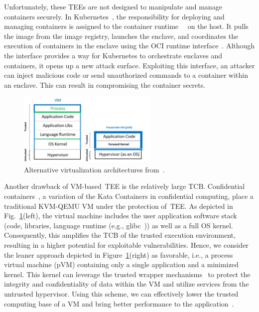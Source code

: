 Unfortunately, these \acrshort{TEE}s are not designed to manipulate and manage containers securely. In Kubernetes~\cite*{k8s}, the responsibility for deploying and managing containers is assigned to the container runtime~\cite*{containerd}~\cite*{cri-o} on the host. It pulls the image from the image registry, launches the enclave, and coordinates the 
execution of containers in the enclave using the OCI runtime interface~\cite*{oci-runtime-spec}. Although the interface provides a way for Kubernetes to orchestrate enclaves and containers, it opens up a new attack surface. Exploiting this interface, an attacker can inject malicious code or send unauthorized commands to 
a container within an enclave. This can result in compromising the container secrets.
 
 
\begin{figure}[!htb]
  \centering
  \includegraphics[width=0.6\textwidth]{images/VM_vs_PVM.png}
  \caption[Alternative virtualization architectures.]{Alternative virtualization architectures from~\cite*{10.1145/3436512}.}
  \label{fig:VM_vs_PVM}
\end{figure}
 
Another drawback of VM-based~\acrshort{TEE} is the relatively large \acrshort{TCB}. Confidential containers~\cite*{confidential_kata}, a variation of the Kata Containers in confidential computing, place a traditional KVM-QEMU VM under the protection of~\acrshort{TEE}. As depicted in Fig.~\ref{fig:VM_vs_PVM}(left), the virtual machine includes the 
user application software stack (code, libraries, language runtime (e.g., glibc~\cite*{glibc})) as well as a full OS kernel. Consequently, this amplifies the \acrshort{TCB} of the trusted execution environment, resulting in a higher potential for exploitable vulnerabilities. Hence, we consider 
the leaner approach depicted in Figure~\ref{fig:VM_vs_PVM}(right) as favorable, i.e., a process virtual machine (\acrshort{pVM}) containing only a single application and a minimized kernel. This kernel can leverage the trusted wrapper mechanisms~\cite*{Hoekstra2013UsingII} to protect the integrity and confidentiality of data within the VM and utilize services 
from the untrusted hypervisor. Using this scheme, we can effectively lower the trusted computing base of a VM and bring better performance to the application~\cite*{quark_performance_report}.
 

